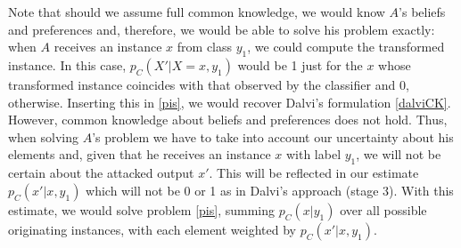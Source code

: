 Note that should we assume full common knowledge, we would know $A$'s beliefs and preferences and, therefore, we would be able to 
solve his problem exactly: when $A$ receives an instance $x$ from class $y_1$, we could compute the transformed instance. In this case, $p_C(X'|X=x,y_1)$ would be 1 just for the $x$ whose transformed instance coincides with
that observed by the classifier and 0, otherwise. Inserting this 
 in \eqref{pis}, we would recover Dalvi's formulation \eqref{dalviCK}.
However, common knowledge about beliefs and preferences does not hold. 
Thus, when solving $A$'s problem we have to take into account our uncertainty about his elements and, given that he receives an instance $x$ with label $y_1$, we will not be certain about the attacked output $x'$.
This will be reflected in our estimate $p_C(x' |x,y_1)$ which will not be 0 or 1 as in Dalvi's approach (stage 3). With this estimate, we would solve problem \eqref{pis}, summing $p_C(x|y_1)$ over all possible originating instances, with each element weighted by $p_C(x' |x,y_1)$.

